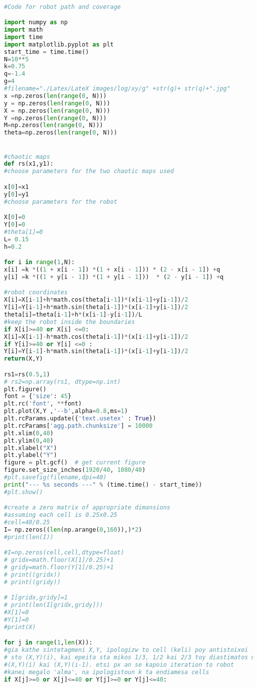 \begin{lstlisting}[language=Python]

#Code for robot path and coverage

import numpy as np
import math
import time
import matplotlib.pyplot as plt
start_time = time.time()
N=10**5
k=0.75
q=-1.4
g=4
#filename="./Latex/LateX images/log/xy/g" +str(g)+ str(q)+".jpg"
x =np.zeros(len(range(0, N)))
y = np.zeros(len(range(0, N)))
X = np.zeros(len(range(0, N)))
Y =np.zeros(len(range(0, N)))
M=np.zeros(len(range(0, N)))
theta=np.zeros(len(range(0, N)))


#chaotic maps
def rs(x1,y1):
#choose parameters for the two chaotic maps used

x[0]=x1
y[0]=y1
#choose parameters for the robot

X[0]=0
Y[0]=0
#theta[1]=0
L= 0.15
h=0.2

for i in range(1,N):
x[i] =k *((1 + x[i - 1]) *(1 + x[i - 1])) * (2 - x[i - 1]) +q
y[i] =k *((1 + y[i - 1]) *(1 + y[i - 1]))  * (2 - y[i - 1]) +q

#robot coordinates
X[i]=X[i-1]+h*math.cos(theta[i-1])*(x[i-1]+y[i-1])/2
Y[i]=Y[i-1]+h*math.sin(theta[i-1])*(x[i-1]+y[i-1])/2
theta[i]=theta[i-1]+h*(x[i-1]-y[i-1])/L
#keep the robot inside the boundaries
if X[i]>=40 or X[i] <=0:
X[i]=X[i-1]-h*math.cos(theta[i-1])*(x[i-1]+y[i-1])/2
if Y[i]>=40 or Y[i] <=0 :
Y[i]=Y[i-1]-h*math.sin(theta[i-1])*(x[i-1]+y[i-1])/2
return(X,Y)

rs1=rs(0.5,1)
# rs2=np.array(rs1, dtype=np.int)
plt.figure()
font = {'size': 45}
plt.rc('font', **font) 
plt.plot(X,Y ,'--b',alpha=0.8,ms=1)
plt.rcParams.update({'text.usetex' : True})
plt.rcParams['agg.path.chunksize'] = 10000
plt.xlim(0,40)
plt.ylim(0,40)
plt.xlabel("X")
plt.ylabel("Y")
figure = plt.gcf()  # get current figure
figure.set_size_inches(1920/40, 1080/40)
#plt.savefig(filename,dpi=40)
print("--- %s seconds ---" % (time.time() - start_time))
#plt.show()

#create a zero matrix of appropriate dimansions
#assuming each cell is 0.25x0.25
#cell=40/0.25
I= np.zeros((len(np.arange(0,160)),)*2)
#print(len(I))

#I=np.zeros(cell,cell,dtype=float)
# gridx=math.floor(X[1]/0.25)+1
# gridy=math.floor(Y[1]/0.25)+1
# print((gridx))
# print((gridy))

# I[gridx,gridy]=1
# print(len(I[gridx,gridy]))
#X[1]=0
#Y[1]=0
#print(X)

for j in range(1,len(X)):
#gia kathe sintetagmeni X,Y, ipologizw to cell (keli) poy antistoixei 
# sto (X,Y)(i), kai epeita sta mikos 1/3, 1/2 kai 2/3 toy diastimatos metaksi
#(X,Y)(i) kai (X,Y)(i-1). etsi px an se kapoio iteration to robot
#kanei megalo 'alma', na ipologistoun k ta endiamesa cells
if X[j]>=0 or X[j]<=40 or Y[j]>=0 or Y[j]<=40:


\end{lstlisting}
